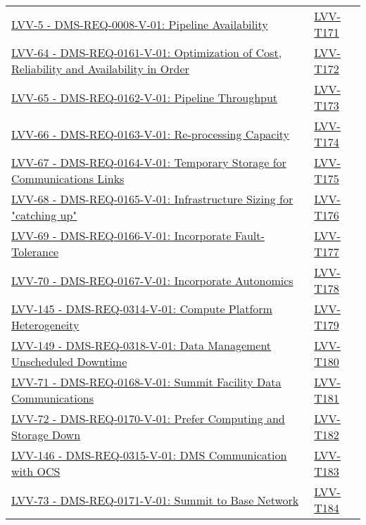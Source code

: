 {\begin{longtable}[]{p{13cm}p{3cm}}
\href{https://jira.lsstcorp.org/browse/LVV-5}{LVV-5 - DMS-REQ-0008-V-01: Pipeline Availability}
& {
\hyperref[lvv-t171]{LVV-T171}
} \\
\href{https://jira.lsstcorp.org/browse/LVV-64}{LVV-64 - DMS-REQ-0161-V-01: Optimization of Cost, Reliability and Availability in Order}
& {
\hyperref[lvv-t172]{LVV-T172}
} \\
\href{https://jira.lsstcorp.org/browse/LVV-65}{LVV-65 - DMS-REQ-0162-V-01: Pipeline Throughput}
& {
\hyperref[lvv-t173]{LVV-T173}
} \\
\href{https://jira.lsstcorp.org/browse/LVV-66}{LVV-66 - DMS-REQ-0163-V-01: Re-processing Capacity}
& {
\hyperref[lvv-t174]{LVV-T174}
} \\
\href{https://jira.lsstcorp.org/browse/LVV-67}{LVV-67 - DMS-REQ-0164-V-01: Temporary Storage for Communications Links}
& {
\hyperref[lvv-t175]{LVV-T175}
} \\
\href{https://jira.lsstcorp.org/browse/LVV-68}{LVV-68 - DMS-REQ-0165-V-01: Infrastructure Sizing for "catching up"}
& {
\hyperref[lvv-t176]{LVV-T176}
} \\
\href{https://jira.lsstcorp.org/browse/LVV-69}{LVV-69 - DMS-REQ-0166-V-01: Incorporate Fault-Tolerance}
& {
\hyperref[lvv-t177]{LVV-T177}
} \\
\href{https://jira.lsstcorp.org/browse/LVV-70}{LVV-70 - DMS-REQ-0167-V-01: Incorporate Autonomics}
& {
\hyperref[lvv-t178]{LVV-T178}
} \\
\href{https://jira.lsstcorp.org/browse/LVV-145}{LVV-145 - DMS-REQ-0314-V-01: Compute Platform Heterogeneity}
& {
\hyperref[lvv-t179]{LVV-T179}
} \\
\href{https://jira.lsstcorp.org/browse/LVV-149}{LVV-149 - DMS-REQ-0318-V-01: Data Management Unscheduled Downtime}
& {
\hyperref[lvv-t180]{LVV-T180}
} \\
\href{https://jira.lsstcorp.org/browse/LVV-71}{LVV-71 - DMS-REQ-0168-V-01: Summit Facility Data Communications}
& {
\hyperref[lvv-t181]{LVV-T181}
} \\
\href{https://jira.lsstcorp.org/browse/LVV-72}{LVV-72 - DMS-REQ-0170-V-01: Prefer Computing and Storage Down}
& {
\hyperref[lvv-t182]{LVV-T182}
} \\
\href{https://jira.lsstcorp.org/browse/LVV-146}{LVV-146 - DMS-REQ-0315-V-01: DMS Communication with OCS}
& {
\hyperref[lvv-t183]{LVV-T183}
} \\
\href{https://jira.lsstcorp.org/browse/LVV-73}{LVV-73 - DMS-REQ-0171-V-01: Summit to Base Network}
& {
\hyperref[lvv-t184]{LVV-T184}
} \\

\end{longtable}}
